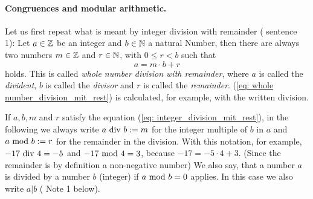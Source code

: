 \paragraph{Congruences and modular arithmetic.}
Let us first repeat what is meant by integer division with remainder (\cite{AL} sentence 1): Let $ a \in \mathbb{Z} $ be an integer and $ b \in \mathbb{N} $ a natural Number, then there are always two numbers $ m \in \mathbb{Z} $ and $ r \in \mathbb{N} $, with $ 0 \leq r <b $ such that
\begin{equation}
\label{eq: integer_division_mit_rest}
a = m \cdot b + r
\end{equation}
holds. This is called \textit{whole number division with remainder}, where $ a $ is called the \textit{divident}, $ b $ is called the \textit{divisor} and $ r $ is called the \textit{remainder}. (\ref{eq: whole number_division_mit_rest}) is calculated, for example, with the written division.

If $ a, b, m $ and $ r $ satisfy the equation (\ref{eq: integer_division_mit_rest}), in the following we always write $ a \text{ div } b: = m $ for the integer multiple of $ b $ in $ a $ and $ a \text{ mod } b: = r $ for the remainder in the division. With this notation, for example, $ -17 \text{ div } 4 = - 5 $ and $ -17 \text{ mod } 4 = 3 $, because $ -17 = -5 \cdot 4 + 3 $. (Since the remainder is by definition a non-negative number) We also say, that a number $ a $ is divided by a number $ b $ (integer) if $ a \text{ mod } b = 0 $ applies. In this case we also write $ a | b $ (\cite{AL} Note 1 below).

